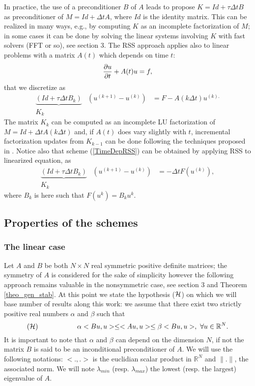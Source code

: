{In practice, the use of a preconditioner $B$ of $A$ leads to propose
$K=Id +\tau \Delta t B$ as preconditioner of $M=Id +\Delta t A$, where $Id$ is the identity matrix. This can be realized
in many ways, e.g., by computing $K$ as an incomplete factorization of $M$; in some cases it can be done by solving the linear systems involving $K$ with fast solvers (FFT or so), see section 3. The RSS approach applies also to linear problems with a matrix $A(t)$ which depends on time $t$: 
\begin{equation}
\frac{\textstyle \partial u} {\textstyle \partial t} +A(t)u=f,
\end{equation}
that we discretize as
\begin{equation}
\begin{array}{cll}
\underbrace{(Id +\tau \Delta t B_k)}&(u^{(k+1)}-u^{(k)})&=F-A(k \Delta t)u^{(k).}\\
\mbox{$K_k$} & & 
\end{array}
\label{TimeDepRSS1}
\end{equation}
The matrix $K_k$ can be computed as an incomplete LU factorization of $M=Id +\Delta t A(k \Delta t)$ and, if $A(t)$ does vary slightly with $t$, incremental factorization updates from $K_{k-1}$ can be done following the techniques proposed in \cite{CalgaroChehabSaad}.
Notice also that scheme (\ref{TimeDepRSS}) can be obtained by applying RSS to linearized equation, as
\begin{equation}
\begin{array}{cll}
\underbrace{(Id +\tau \Delta t B_k)}&(u^{(k+1)}-u^{(k)})&=-\Delta t F(u^{(k)}),\\
\mbox{$K_k$} & & 
\end{array}
\label{TimeDepRSS}
\end{equation}
where $B_k$ is here such that $F(u^k)=B_k u^k$.
\subsection{Properties of the schemes}
\subsubsection{The linear case}
Let $A$ and $B$ be both $N\times N$  real symmetric positive definite matrices; the symmetry of $A$ is considered for the sake of simplicity however  the following approach remains valuable in the nonsymmetric case, see section 3 and 
Theorem \ref{theo_gen_stab}. At this point we state the hypothesis (${\cal H}$) on which we will base number of results along this work: we assume that there exist two strictly positive real numbers $\alpha$ and $\beta$ such that
$$
({\cal H})\hskip 2.cm  \alpha <Bu,u>\le <Au,u> \le \beta <Bu,u>, \ \forall u \in {\mathbb R}^N.
$$
It is important to note that $\alpha$ and $\beta$ can depend on the dimension $N$, if not the matrix $B$ is said to be an inconditional preconditioner of $A$.
We will use the following notations: $<.,.>$ is the euclidian scalar product in ${\mathbb R}^N$ and 
$\parallel .\parallel$, the associated norm.
We will note $\lambda_{min}$ (resp. $\lambda_{max}$) the lowest (resp. the largest) eigenvalue of $A$.

}
